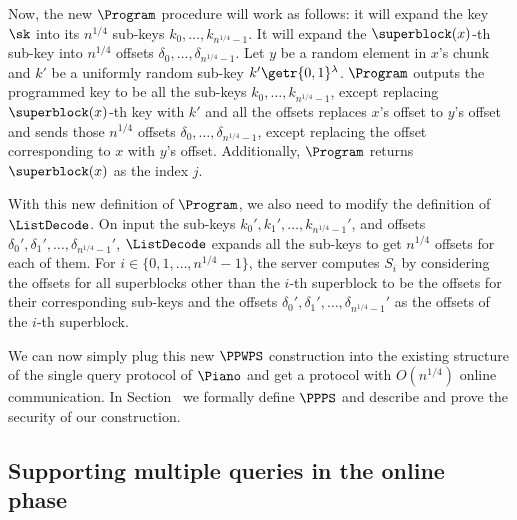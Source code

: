 

Now, the new $\Program$ procedure will work as follows: it will expand the key $\sk$ into its $n^{1/4}$ sub-keys $k_0,\dots,k_{n^{1/4}-1}$. It will expand the $\superblock(x)$-th
sub-key into $n^{1/4}$ offsets $\delta_0,\dots,\delta_{n^{1/4}-1}$. Let $y$ be a random element in $x$'s chunk and $k'$ be a uniformly random sub-key $k'\getr\{0,1\}^\lambda$. $\Program$ outputs the programmed key to be all the sub-keys $k_0,\dots,k_{n^{1/4}-1}$, except replacing $\superblock(x)$-th key with $k'$ and all the offsets 
replaces $x$'s offset to $y$'s offset and sends those $n^{1/4}$ offsets $\delta_0,\dots,\delta_{n^{1/4}-1}$, except replacing the offset corresponding to $x$ with $y$'s offset. Additionally, $\Program$ returns $\superblock(x)$ as the index $j$.

With this new definition of $\Program$, we also need to modify the definition of $\ListDecode$. On input the sub-keys $k_0',k_1',\ldots,k_{n^{1/4}-1}'$, and offsets $\delta_0',\delta_1',\ldots,\delta_{n^{1/4}-1}'$, 
$\ListDecode$ expands all the sub-keys to get $n^{1/4}$ offsets for each of them. For $i\in \{0,1,\ldots,n^{1/4}-1\}$, the server computes $S_i$ by considering the offsets for all superblocks other than the $i$-th superblock to be the offsets for their corresponding sub-keys and the offsets $\delta_0',\delta_1',\ldots,\delta_{n^{1/4}-1}'$ as the offsets of the $i$-th superblock.


We can now simply plug this new $\PPWPS$ construction into the existing structure of the single query protocol of $\Piano$ and get a protocol with $O(n^{1/4})$ online communication. In Section~ we formally define $\PPPS$ and describe and prove the security of our construction. 

\subsection{Supporting multiple queries in the online phase} 

